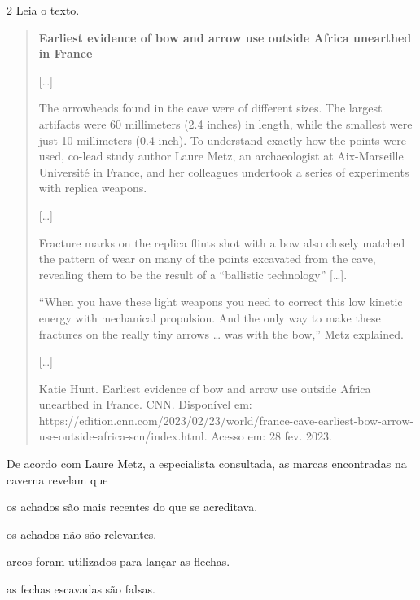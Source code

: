 
\num{2} Leia o texto.

\begin{quote}
\textbf{Earliest evidence of bow and arrow use outside Africa unearthed in France}

{[}\ldots{}{]}

The arrowheads found in the cave were of different sizes. The largest
artifacts were 60 millimeters (2.4 inches) in length, while the smallest
were just 10 millimeters (0.4 inch). To understand exactly how the
points were used, co-lead study author Laure Metz, an archaeologist at
Aix-Marseille Université in France, and her colleagues undertook a
series of experiments with replica weapons.

{[}\ldots{}{]}

Fracture marks on the replica flints shot with a bow also closely
matched the pattern of wear on many of the points excavated from the
cave, revealing them to be the result of a ``ballistic technology''
{[}\ldots{}{]}.

``When you have these light weapons you need to correct this low kinetic
energy with mechanical propulsion. And the only way to make these
fractures on the really tiny arrows \ldots{} was with the bow,'' Metz
explained.

{[}\ldots{}{]}

Katie Hunt. Earliest evidence of bow and arrow use outside Africa
unearthed in France. CNN. Disponível em:
https://edition.cnn.com/2023/02/23/world/france-cave-earliest-bow-arrow-use-outside-africa-scn/index.html.
Acesso em: 28 fev. 2023.
\end{quote}

De acordo com Laure Metz, a especialista consultada, as marcas encontradas na caverna revelam que

\begin{escolha}
\item os achados são mais recentes do que se acreditava.

\item os achados não são relevantes.

\item arcos foram utilizados para lançar as flechas.

\item as fechas escavadas são falsas.
\end{escolha}

